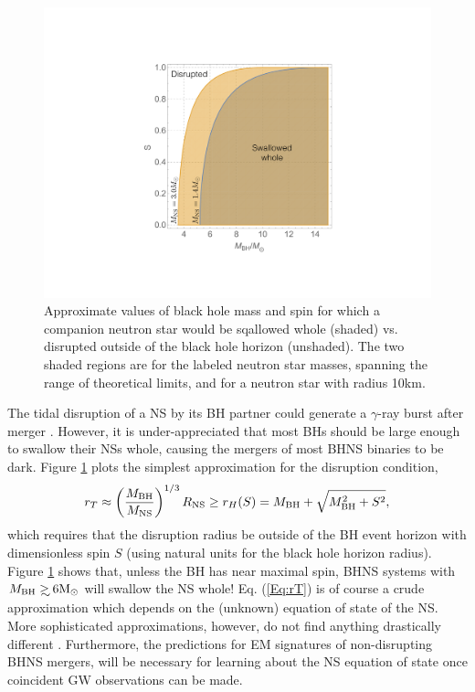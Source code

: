 \begin{figure}
\begin{center}
\includegraphics[scale=0.33]{figures/ch0/BHNS_TDs} 
\end{center}
\caption{Approximate values of black hole mass and spin for which a companion neutron star would be sqallowed whole (shaded) vs. disrupted outside of the black hole horizon (unshaded). The two shaded regions are for the labeled neutron star masses, spanning the range of theoretical limits, and for a neutron star with radius 10km.}
\label{Fig:NSBH_TDs}
\end{figure}

The tidal disruption of a NS by its BH partner could generate a $\gamma$-ray
burst after merger \citep{NPP:NSBH_GRB:1992}. However, it is under-appreciated
that most BHs should be large enough to swallow their NSs
whole, causing the mergers of most BHNS binaries to be dark. Figure 
\ref{Fig:NSBH_TDs} plots the simplest approximation for the disruption condition,
\begin{equation}
 r_T \approx \left( \frac{M_{\rm{BH}} }{ M_{\rm{NS}}} \right)^{1/3} R_{\rm{NS}} \geq r_H(S) 
 = M_{\rm{BH}} + \sqrt{M^2_{\rm{BH}} + S^2},
 \label{Eq:rT}
\end{equation}
which requires that the disruption radius be outside of the BH event horizon
with dimensionless spin $S$ (using natural units for the black hole horizon
radius). Figure \ref{Fig:NSBH_TDs} shows that, unless the BH has near maximal
spin, BHNS systems with $M_{\rm{BH}} \gsim 6 \msun$ will swallow the NS whole!
Eq. (\ref{Eq:rT}) is of course a crude approximation which depends on the
(unknown) equation of state of the NS. More sophisticated approximations,
however, do not find anything drastically different
\citep[\emph{e.g.}][]{Foucart:2012}. Furthermore, the predictions for EM
signatures of non-disrupting BHNS mergers, will be necessary for learning
about the NS equation of state once coincident GW observations can be made.


